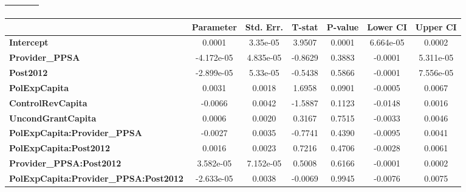 \begin{center}
\begin{tabular}{lclc}
\textbf{}                                     &                    & \textbf{                     }   &                  \\
\bottomrule
\end{tabular}
\begin{tabular}{lcccccc}
                                              & \textbf{Parameter} & \textbf{Std. Err.} & \textbf{T-stat} & \textbf{P-value} & \textbf{Lower CI} & \textbf{Upper CI}  \\
\midrule
\textbf{Intercept}                            &       0.0001       &      3.35e-05      &      3.9507     &      0.0001      &     6.664e-05     &       0.0002       \\
\textbf{Provider\_PPSA}                       &     -4.172e-05     &     4.835e-05      &     -0.8629     &      0.3883      &      -0.0001      &     5.311e-05      \\
\textbf{Post2012}                             &     -2.899e-05     &      5.33e-05      &     -0.5438     &      0.5866      &      -0.0001      &     7.556e-05      \\
\textbf{PolExpCapita}                         &       0.0031       &       0.0018       &      1.6958     &      0.0901      &      -0.0005      &       0.0067       \\
\textbf{ControlRevCapita}                     &      -0.0066       &       0.0042       &     -1.5887     &      0.1123      &      -0.0148      &       0.0016       \\
\textbf{UncondGrantCapita}                    &       0.0006       &       0.0020       &      0.3167     &      0.7515      &      -0.0033      &       0.0046       \\
\textbf{PolExpCapita:Provider\_PPSA}          &      -0.0027       &       0.0035       &     -0.7741     &      0.4390      &      -0.0095      &       0.0041       \\
\textbf{PolExpCapita:Post2012}                &       0.0016       &       0.0023       &      0.7216     &      0.4706      &      -0.0028      &       0.0061       \\
\textbf{Provider\_PPSA:Post2012}              &     3.582e-05      &     7.152e-05      &      0.5008     &      0.6166      &      -0.0001      &       0.0002       \\
\textbf{PolExpCapita:Provider\_PPSA:Post2012} &     -2.633e-05     &       0.0038       &     -0.0069     &      0.9945      &      -0.0076      &       0.0075       \\
\bottomrule
\end{tabular}
\end{center}